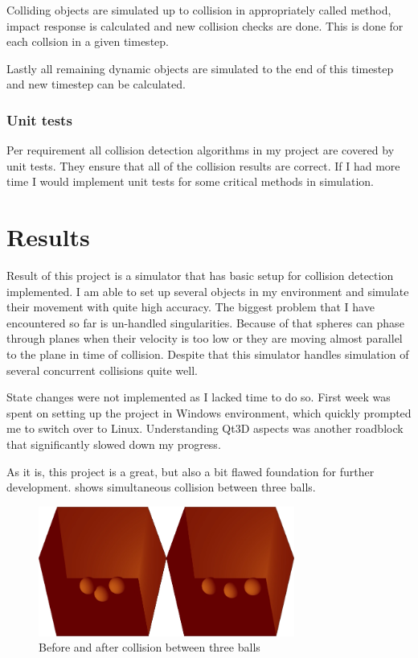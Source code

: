 \documentclass[a4,10pt]{article}
\begin{document}
Colliding objects are simulated up to collision in appropriately called method, impact response is calculated and new collision checks are done. This is done for each collsion in a given timestep.

Lastly all remaining dynamic objects are simulated to the end of this timestep and new timestep can be calculated.

\subsubsection{Unit tests}
Per requirement all collision detection algorithms in my project are covered by unit tests. They ensure that all of the collision results are correct. If I had more time I would implement unit tests for some critical methods in simulation.

\section{Results}
Result of this project is a simulator that has basic setup for collision detection implemented. I am able to set up several objects in my environment and simulate their movement with quite high accuracy. The biggest problem that I have encountered so far is un-handled singularities. Because of that spheres can phase through planes when their velocity is too low or they are moving almost parallel to the plane in time of collision. Despite that this simulator handles simulation of several concurrent collisions quite well.

State changes were not implemented as I lacked time to do so. First week was spent on setting up the project in Windows environment, which quickly prompted me to switch over to Linux. Understanding Qt3D aspects was another roadblock that significantly slowed down my progress.

As it is, this project is a great, but also a bit flawed foundation for further development.  shows simultaneous collision between three balls.
\begin{figure}[H]
  \centering
  \includegraphics[width=0.75\textwidth]{BeforeAndAfter}
  \caption{Before and after collision between three balls}\label{BeforeAndAfter}
\end{figure}
\end{document}
